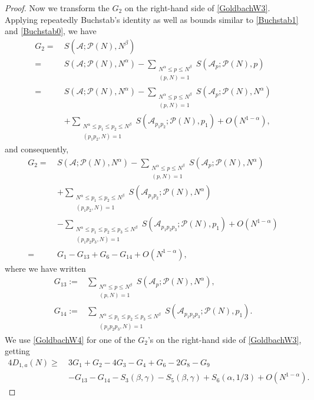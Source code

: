 \documentclass[12pt, a4paper]{amsart}
\def\le{\leqslant}
\def\ge{\geqslant}
\theoremstyle{plain}
\theoremstyle{remark}
\numberwithin{equation}{section}
\begin{document}
\begin{proof}
Now we transform the $G_2$ on the right-hand side of \eqref{GoldbachW3}.  
Applying repeatedly Buchstab's identity as well as bounds similar to \eqref{Buchstab1} and \eqref{Buchstab0}, 
we have
\begin{equation*} 
\begin{split}
G_2=\ &S(\mathscr{A};\mathscr{P}(N),N^\beta)\\
		=\ & S(\mathscr{A};\mathscr{P}(N),N^\alpha)-\sum\limits_{\substack{N^\alpha\le p\le N^{\beta} \\(p, N)=1}}S(\mathscr{A}_p ; \mathscr{P}(N), p)\\
=\ & S(\mathscr{A};\mathscr{P}(N),N^\alpha)-\sum\limits_{\substack{N^\alpha\le p\le N^{\beta} \\(p, N)=1}}S(\mathscr{A}_p ; \mathscr{P}(N), N^\alpha)\\
&+\sum_{\substack{N^\alpha \le p_1 \le p_2 \le N^\beta \\ (p_1 p_2, N) = 1}}  S(\mathscr{A}_{p_1 p_2}; \mathscr{P}(N), p_1)+O(N^{1-\alpha}), 
\end{split}
\end{equation*}
and consequently,  
\begin{equation}\label{GoldbachW4}
\begin{split}
G_2
=\ & S(\mathscr{A};\mathscr{P}(N),N^\alpha)-\sum\limits_{\substack{N^\alpha\le p\le N^{\beta} \\(p, N)=1}}S(\mathscr{A}_p ; \mathscr{P}(N), N^\alpha)\\
		&+\sum_{\substack{N^\alpha \le p_1 \le p_2 \le N^\beta \\ (p_1 p_2, N) = 1}}  S(\mathscr{A}_{p_1 p_2}; \mathscr{P}(N), N^\alpha)\\
		&-\sum_{\substack{N^\alpha \le p_1 \le p_2 \le p_3\le N^\beta \\ (p_1 p_2 p_3, N) = 1}}  S(\mathscr{A}_{p_1 p_2 p_3}; \mathscr{P}(N), p_1)+O(N^{1-\alpha})\\
=\ &G_1-G_{13}+G_6-G_{14}+O(N^{1-\alpha}),
		\end{split}
		\end{equation}
where we have written 
		\begin{equation}
		\begin{split}
		G_{13}:=&\sum\limits_{\substack{N^\alpha\le p\le N^{\beta} \\(p, N)=1}}
S(\mathscr{A}_p ; \mathscr{P}(N), N^\alpha),\\
		G_{14}:=&\sum_{\substack{N^\alpha \le p_1 \le p_2 \le p_3\le N^\beta \\ (p_1 p_2 p_3, N) = 1}}  S(\mathscr{A}_{p_1 p_2 p_3}; \mathscr{P}(N), p_1). 
		\end{split}
		\end{equation}
We use \eqref{GoldbachW4} for one of the $G_2$'s on the right-hand side of \eqref{GoldbachW3}, getting 
\begin{equation}\label{GoldbachW5}
\begin{split}
4D_{1,a}(N)
\ge\ & 3G_1+G_2-4G_3-G_4+G_6-2G_8-G_9\\
&-G_{13}-G_{14}-S_3(\beta,\gamma)-S_5(\beta,\gamma)+S_6(\alpha,1/3)+O(N^{1-\alpha}). 
\end{split}
\end{equation}
		

\end{proof}
\end{document}
